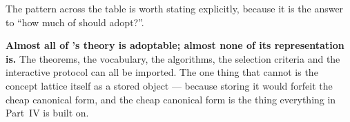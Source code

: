 The pattern across the table is worth stating explicitly, because it is the
answer to ``how much of \fca{} should \odag{} adopt?''.

\begin{keyidea}
\textbf{Almost all of \fca{}'s theory is adoptable; almost none of its
representation is.} The theorems, the vocabulary, the algorithms, the
selection criteria and the interactive protocol can all be imported. The one
thing that cannot is the concept lattice itself as a stored object --- because
storing it would forfeit the cheap canonical form, and the cheap canonical
form is the thing everything in Part~IV is built on.
\end{keyidea}
